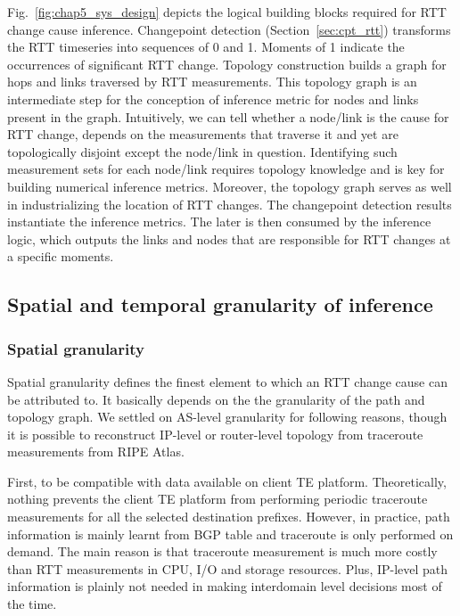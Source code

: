Fig.~\ref{fig:chap5_sys_design} depicts the logical building blocks required for RTT change cause inference. Changepoint detection (Section~\ref{sec:cpt_rtt}) transforms the RTT timeseries into sequences of 0 and 1. Moments of 1 indicate the occurrences of significant RTT change.
Topology construction builds a graph for hops and links traversed by RTT measurements.
This topology graph is an intermediate step for the conception of inference metric for nodes and links present in the graph. Intuitively, we can tell whether a node/link is the cause for RTT change, depends on the measurements that traverse it and yet are topologically disjoint except the node/link in question. Identifying such measurement sets for each node/link requires topology knowledge and is key for building numerical inference metrics. Moreover, the topology graph serves as well in industrializing the location of RTT changes. 
The changepoint detection results instantiate the inference metrics.
The later is then consumed by the inference logic, which outputs the links and nodes that are responsible for RTT changes at a specific moments.

\subsection{Spatial and temporal granularity of inference}
\subsubsection{Spatial granularity}
Spatial granularity defines the finest element to which an RTT change cause can be attributed to.
It basically depends on the the granularity of the path and topology graph. We settled on AS-level granularity for following reasons, though it is possible to reconstruct IP-level or router-level topology\cite{Donnet2007} from traceroute measurements from RIPE Atlas.

First, to be compatible with data available on client TE platform. Theoretically, nothing prevents the client TE platform from performing periodic traceroute measurements for all the selected destination prefixes. However, in practice, path information is mainly learnt from BGP table and traceroute is only performed on demand. The main reason is that traceroute measurement is much  more costly than RTT measurements in CPU, I/O and storage resources. Plus, IP-level path information is plainly not needed in making interdomain level decisions most of the time.

